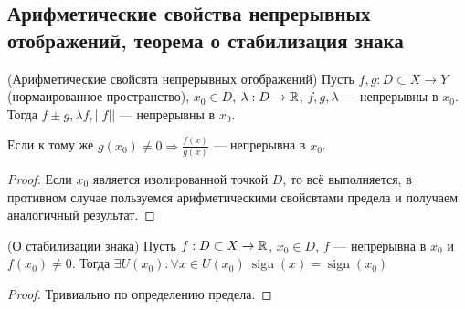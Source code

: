 \newpage
\subsection{Арифметические свойства непрерывных отображений, теорема о стабилизация знака}

\begin{theorem} (Арифметические свойсвта непрерывных отображений)
Пусть $f, g: D \subset X \rightarrow Y$ (нормаированное пространство), $x_0 \in D$, $\lambda: D \rightarrow \operatorname*{\mathbb{R}}$, $f, g, \lambda$ {---} непрерывны в $x_0$. Тогда $f \pm g, \lambda f, ||f||$ {---} непрерывны в $x_0$.
\end{theorem} 
\begin{remark}
Если к тому же $\displaystyle g(x_0) \neq 0 \Rightarrow \frac{f(x)}{g(x)}$ {---} непрерывна в $x_0$.
\end{remark}
\begin{proof}
Если $x_0$ является изолированной точкой $D$, то всё выполняется, в противном случае пользуемся арифметическими свойсвтами предела и получаем аналогичный результат.
\end{proof}

\begin{theorem} (О стабилизации знака)
Пусть $f: D \subset X \rightarrow \operatorname*{\mathbb{R}}$, $x_0 \in D$, $f$ {---} непрерывна в $x_0$ и $f(x_0) \neq 0$. Тогда $\exists U(x_0): \forall x \in U(x_0) \ \operatorname{sign}(x) = \operatorname{sign}(x_0)$ 
\end{theorem}
\begin{proof}
Тривиально по определению предела.
\end{proof}
